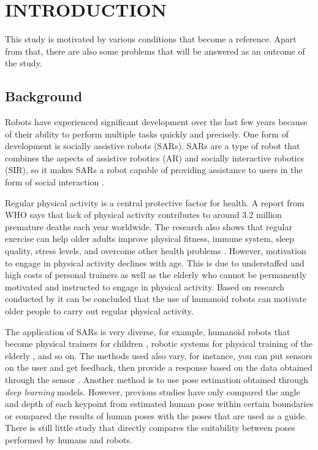 \chapter{INTRODUCTION}
\label{chap:introduction}

This study is motivated by various conditions that become a reference. Apart from that, there are also some problems that
will be answered as an outcome of the study.

\section{Background}
\label{sec:background}

Robots have experienced significant development over the last few years 
because of their ability to perform multiple tasks quickly and precisely.
One form of development is socially assistive robots (SARs). 
SARs are a type of robot that combines the aspects of assistive robotics (AR)
and socially interactive robotics (SIR), so it makes SARs a robot capable of providing assistance to users in the form of social interaction \parencite{feil2005}.

Regular physical activity is a central protective factor for health.
A report from WHO says that lack of physical activity contributes to around 3.2 million premature deaths each year worldwide.
The research also shows that regular exercise can help older adults improve physical fitness, immune system, sleep quality, stress levels, and overcome other health problems \parencite{lotfi2018}.
However, motivation to engage in physical activity declines with age. 
This is due to understaffed and high costs of personal trainers as well as the elderly who cannot be permanently motivated and instructed to engage in physical activity.
Based on research conducted by \parencite{ruf2020} it can be concluded that the use of humanoid robots can motivate older people to carry out regular physical activity.

The application of SARs is very diverse, for example, humanoid robots that become physical trainers for children \parencite{güneysu2017}, 
robotic systems for physical training of the elderly \parencite{avioz2021}, and so on. The methods used also vary, for instance, 
you can put sensors on the user and get feedback, then provide a response based on the data obtained through the sensor \parencite{güneysu2017}. 
Another method is to use pose estimation obtained through \emph{deep learning} models.
However, previous studies have only compared the angle and depth of each keypoint from estimated human pose within certain boundaries or compared the results of human poses with the poses that are used as a guide. \parencite{romeo}
There is still little study that directly compares the suitability between poses performed by humans and robots.

